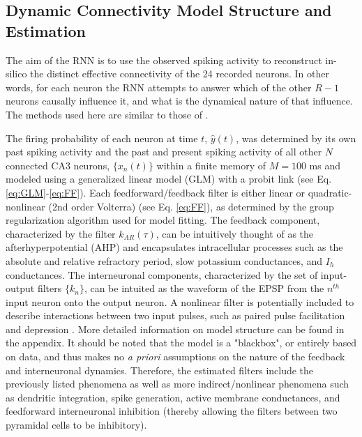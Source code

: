 \documentclass[journal,twoside,web]{ieeecolor}
\newcommand{\nn}{24}    %
\begin{document}
\subsection{Dynamic Connectivity Model Structure and Estimation}

The aim of the RNN is to use the observed spiking activity to reconstruct in-silico the distinct effective connectivity of the \nn{} recorded neurons.
In other words, for each neuron the RNN attempts to answer which of the other $R-1$ neurons causally influence it, and what is the dynamical nature of that influence. The methods used here are similar to those of \cite{song16sparse}.


The firing probability of each neuron at time $t$, $\hat{y}(t)$, was determined by its own past spiking activity and the past and present spiking activity of all other $N$ connected CA3 neurons, $\{x_n(t)\}$ within a finite memory of $M=100$ ms and modeled using a generalized linear model (GLM) with a probit link (see Eq. \ref{eq:GLM}-\ref{eq:FF}).
Each feedforward/feedback filter is either linear or quadratic-nonlinear (2nd order Volterra)  (see Eq. \ref{eq:FF}), as determined by the group regularization algorithm used for model fitting.
The feedback component, characterized by the filter $k_{AR}(\tau)$, can be intuitively thought of as the afterhyperpotential (AHP) \cite{spruston07} and encapsulates intracellular processes such as the absolute and relative refractory period, slow potassium conductances, and $I_h$ conductances.
The interneuronal components, characterized by the set of input-output filters $\{k_n\}$, can be intuited as the waveform of the EPSP from the $n^{th}$ input neuron onto the output neuron.
A nonlinear filter is potentially included to describe interactions between two input pulses, such as paired pulse facilitation and depression \cite{song09par1,sandler15}.
More detailed information on model structure can be found in the appendix. 
It should be noted that the model is a "blackbox", or entirely based on data, and thus makes no \textit{a priori} assumptions on the nature of the feedback and interneuronal dynamics.
Therefore, the estimated filters include the previously listed phenomena as well as more indirect/nonlinear phenomena such as dendritic integration, spike generation, active membrane conductances, and feedforward interneuronal inhibition (thereby allowing the filters between two pyramidal cells to be inhibitory).
\end{document}
